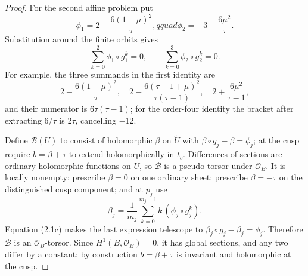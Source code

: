 \begin{proof}
For the second affine problem put
\[
 \phi_1=2-\frac{6(1-\mu)^2}{\tau},qquad
 \phi_2=-3-\frac{6\mu^2}{\tau}.
\]
Substitution around the finite orbits gives
\[
 \sum_{k=0}^{2}\phi_1\circ g_1^k=0,
 \qquad
 \sum_{k=0}^{3}\phi_2\circ g_2^k=0.
 \tag{2.1c}
\]
For example, the three summands in the first identity are
\[
2-\frac{6(1-\mu)^2}{\tau},\quad
2-\frac{6(\tau-1+\mu)^2}{\tau(\tau-1)},\quad
2+\frac{6\mu^2}{\tau-1},
\]
and their numerator is \(6\tau(\tau-1)\); for the order-four identity the
bracket after extracting \(6/\tau\) is \(2\tau\), cancelling \(-12\).

Define \(\mathcal B(U)\) to consist of holomorphic \(\beta\) on
\(\widetilde U\) with
\(\beta\circ g_j-\beta=\phi_j\); at the cusp require
\(b=\beta+\tau\) to extend holomorphically in \(t_c\).  Differences of
sections are ordinary holomorphic functions on \(U\), so
\(\mathcal B\) is a pseudo-torsor under \(\mathcal O_B\).  It is locally
nonempty: prescribe \(\beta=0\) on one ordinary sheet; prescribe
\(\beta=-\tau\) on the distinguished cusp component; and at \(p_j\) use
\[
 \beta_j=\frac1{m_j}\sum_{k=0}^{m_j-1}
 k\,(\phi_j\circ g_j^k).
 \tag{2.1d}
\]
Equation (2.1c) makes the last expression telescope to
\(\beta_j\circ g_j-\beta_j=\phi_j\).  Therefore \(\mathcal B\) is an
\(\mathcal O_B\)-torsor.  Since \(H^1(B,\mathcal O_B)=0\), it has global
sections, and any two differ by a constant; by construction
\(b=\beta+\tau\) is invariant and holomorphic at the cusp.


\end{proof}

